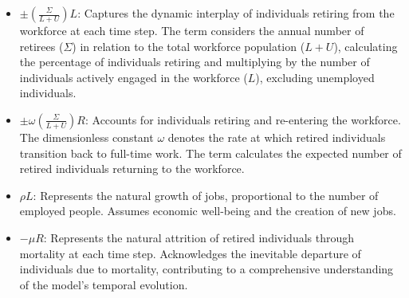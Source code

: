 \documentclass[11pt]{amsart}
\begin{document}
    


\begin{itemize}
    \item $\pm\left(\frac{\Sigma}{L + U}\right) L$: Captures the dynamic interplay of individuals retiring from the workforce at each time step. The term considers the annual number of retirees ($\Sigma$) in relation to the total workforce population ($L + U$), calculating the percentage of individuals retiring and multiplying by the number of individuals actively engaged in the workforce ($L$), excluding unemployed individuals.

    \item $\pm \omega\left(\frac{\Sigma}{L + U}\right) R$: Accounts for individuals retiring and re-entering the workforce. The dimensionless constant $\omega$ denotes the rate at which retired individuals transition back to full-time work. The term calculates the expected number of retired individuals returning to the workforce.

    \item $\rho L$: Represents the natural growth of jobs, proportional to the number of employed people. Assumes economic well-being and the creation of new jobs.

    \item $-\mu R$: Represents the natural attrition of retired individuals through mortality at each time step. Acknowledges the inevitable departure of individuals due to mortality, contributing to a comprehensive understanding of the model's temporal evolution.
\end{itemize}
\end{document}
